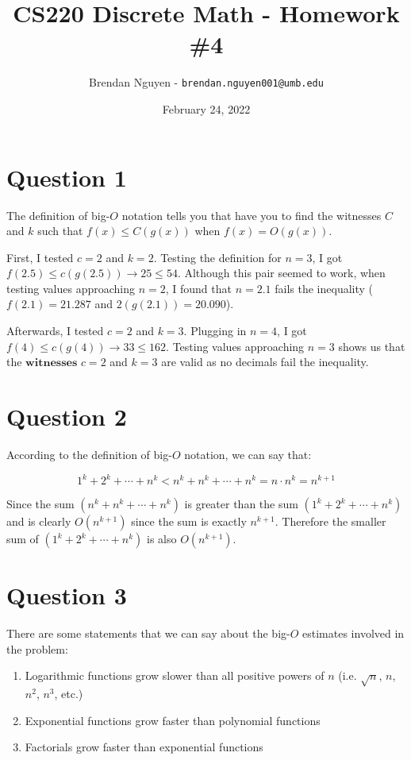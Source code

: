 \documentclass[11pt]{article}
\title{CS220 Discrete Math - Homework \#4}
\author{Brendan Nguyen - \texttt{brendan.nguyen001@umb.edu}}
\date{February 24, 2022}
\begin{document}
\maketitle

\section*{Question 1}
The definition of big-$\textit{O}$ notation tells you that have you to find the witnesses $C$ and $k$ such that $f(x) \leq C(g(x))$ when $f(x) = O(g(x))$.

First, I tested $c=2$ and $k=2$. Testing the definition for $n=3$, I got $f(2.5) \leq c(g(2.5)) \to 25 \leq 54$. Although this pair seemed to work, when testing values approaching $n=2$, I found that $n=2.1$ fails the inequality ($f(2.1)=21.287$ and $2(g(2.1))=20.090$).

Afterwards, I tested $c=2$ and $k=3$. Plugging in $n=4$, I got $f(4) \leq c(g(4)) \to 33 \leq 162$. Testing values approaching $n=3$ shows us that the $\textbf{witnesses}$ $c=2$ and $k=3$ are valid as no decimals fail the inequality.

\section*{Question 2}
According to the definition of big-$\textit{O}$ notation, we can say that:

\[1^k + 2^k + \cdots + n^k < n^k + n^k + \cdots + n^k = n \cdot n^k = n^{k+1}\]

Since the sum $(n^k + n^k + \cdots + n^k)$ is greater than the sum $(1^k + 2^k + \cdots + n^k)$ and is clearly $O(n^{k+1})$ since the sum is exactly $n^{k+1}$. Therefore the smaller sum of $(1^k + 2^k + \cdots + n^k)$ is also $O(n^{k+1})$.

\section*{Question 3}
There are some statements that we can say about the big-$\textit{O}$ estimates involved in the problem:
\begin{enumerate}
    \item Logarithmic functions grow slower than all positive powers of $n$ (i.e. $\sqrt{n}$, $n$, $n^2$, $n^3$, etc.)
    \item Exponential functions grow faster than polynomial functions
    \item Factorials grow faster than exponential functions
\end{enumerate}
\end{document}
